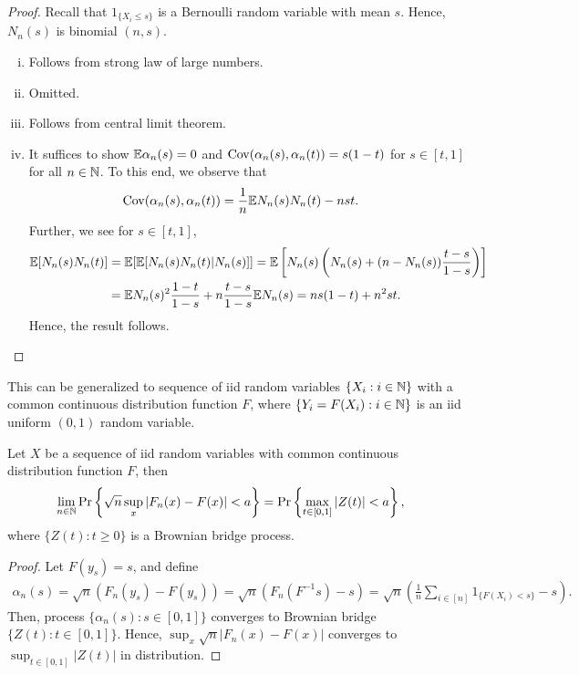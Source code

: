 \documentclass[a4paper,10pt,english]{article}
\begin{document}
\begin{proof} Recall that $1_{\{X_i \leq s\}}$ is a Bernoulli random variable with mean $s$. 
Hence, $N_n(s)$ is binomial $(n,s)$.
\begin{enumerate}[i)]
\item Follows from strong law of large numbers.
\item Omitted.
\item Follows from central limit theorem.
\item It suffices to show $\mathbb{E} \alpha_n(s) = 0$ and $\operatorname{Cov}(\alpha_n(s), \alpha_n(t)) = s(1-t)$ for $s \in [t,1]$ for all $n \in \mathbb{N}$. 
To this end, we observe that
\begin{align*}
\operatorname{Cov}(\alpha_n(s), \alpha_n(t)) &= \frac{1}{n} \mathbb{E} N_n(s) N_n(t) - nst.
\end{align*}
Further, we see for $s \in [t,1]$, 
\begin{align*}
\mathbb{E}[N_n(s) N_n(t)] &= \mathbb{E}[\mathbb{E}[N_n(s)N_n(t)|N_n(s)]] = \mathbb{E}\left[ N_n(s)\left(N_n(s) + (n-N_n(s))\frac{t-s}{1-s}\right)\right]\\
& = \mathbb{E} N_n(s)^2\frac{1-t}{1-s} + n\frac{t-s}{1-s}\mathbb{E} N_n(s) = ns(1-t) + n^2st.
\end{align*}
Hence, the result follows.
\end{enumerate}
\end{proof}
\begin{rem} This can be generalized to sequence of iid random variables $\{X_i :  i \in \mathbb{N}\}$ with a common continuous distribution function $F$, where $\{Y_i = F(X_i): i \in \mathbb{N}\}$ is an iid uniform $(0,1)$ random variable. %
\end{rem}
\begin{prop} Let $X$ be a sequence of iid random variables with common continuous distribution function $F$, then 
\begin{align*}
\lim_{n \in \mathbb{N}}\Pr\left\{\sqrt{n}\sup_{x}|F_n(x) - F(x)| < a\right\} & = \Pr\left\{\max_{t \in [0,1]}|Z(t)| < a\right\},
\end{align*}
where $\{Z(t) : t \geqslant 0\}$ is a Brownian bridge process.
\end{prop}
\begin{proof}
Let $F(y_s) = s$, and define
\begin{align*}
\alpha_n(s) = \sqrt{n}(F_n(y_s)-F(y_s)) = \sqrt{n}(F_n(F^{-1}s) - s) = \sqrt{n}\left(\frac{1}{n}\sum_{i \in [n]}1_{\{F(X_i) < s\}} - s\right).
\end{align*}
Then, process $\{\alpha_n(s) : s \in [0,1]\}$ converges to Brownian bridge $\{Z(t) : t \in [0,1]\}$. 
Hence, $\sup_x \sqrt{n}|F_n(x)-F(x)|$ converges to $\sup_{t \in [0,1]}|Z(t)|$ in distribution.
\end{proof}
\end{document}
